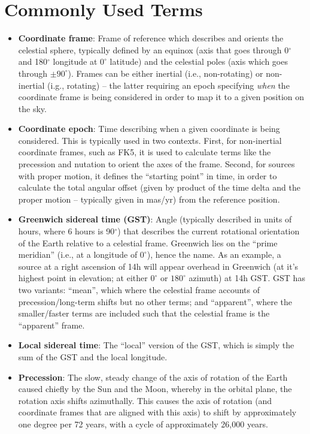 \documentclass[11pt, oneside]{article}
\begin{document}
\section{Commonly Used Terms}\label{appx:glossary}
\begin{itemize}
    \item\textbf{Coordinate frame}: Frame of reference which describes and orients the celestial sphere, typically defined by an equinox (axis that goes through 0$^{\circ}$ and 180$^{\circ}$ longitude at $0^{\circ}$ latitude) and the celestial poles (axis which goes through $\pm90^{\circ}$). Frames can be either inertial (i.e., non-rotating) or non-inertial (i.g., rotating) -- the latter requiring an epoch specifying \emph{when} the coordinate frame is being considered in order to map it to a given position on the sky.
    \item\textbf{Coordinate epoch}: Time describing when a given coordinate is being considered. This is typically used in two contexts. First, for non-inertial coordinate frames, such as FK5, it is used to calculate terms like the precession and nutation to orient the axes of the frame. Second, for sources with proper motion, it defines the ``starting point'' in time, in order to calculate the total angular offset (given by product of the time delta and the proper motion -- typically given in mas/yr) from the reference position.
    \item\textbf{Greenwich sidereal time (GST)}: Angle (typically described in units of hours, where 6 hours is 90$^{\circ}$) that describes the current rotational orientation of the Earth relative to a celestial frame. Greenwich lies on the ``prime meridian'' (i.e., at a longitude of $0^{\circ}$), hence the name. As an example, a source at a right ascension of 14h will appear overhead in Greenwich (at it's highest point in elevation; at either $0^{\circ}$ or $180^{\circ}$ azimuth) at 14h GST. GST has two variants: ``mean'', which where the celestial frame accounts of precession/long-term shifts but no other terms; and ``apparent'', where the smaller/faster terms are included such that the celestial frame is the ``apparent'' frame.
    \item\textbf{Local sidereal time}: The ``local'' version of the GST, which is simply the sum of the GST and the local longitude. 
    \item\textbf{Precession}: The slow, steady change of the axis of rotation of the Earth caused chiefly by the Sun and the Moon, whereby in the orbital plane, the rotation axis shifts azimuthally. This causes the axis of rotation (and coordinate frames that are aligned with this axis) to shift by approximately one degree per 72 years, with a cycle of approximately 26,000 years.

\end{itemize}
\end{document}
